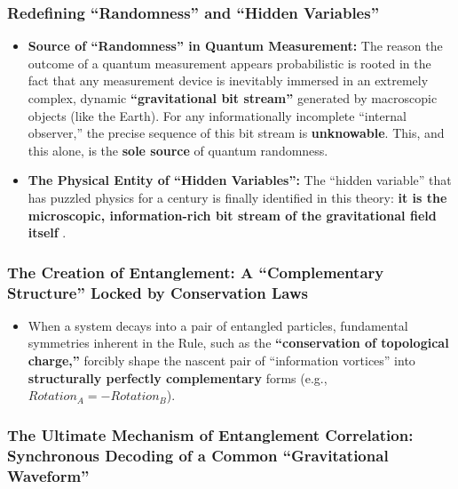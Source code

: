 \documentclass[11pt, a4paper]{article}
\begin{document}
\subsubsection{Redefining ``Randomness'' and ``Hidden Variables''}

\begin{itemize}
    \item \textbf{Source of ``Randomness'' in Quantum Measurement:}
    The reason the outcome of a quantum measurement appears probabilistic is rooted in the fact that any measurement device is inevitably immersed in an extremely complex, dynamic \textbf{``gravitational bit stream''} generated by macroscopic objects (like the Earth). For any informationally incomplete ``internal observer,'' the precise sequence of this bit stream is \textbf{unknowable}. This, and this alone, is the \textbf{sole source} of quantum randomness.

    \item \textbf{The Physical Entity of ``Hidden Variables'':}
    The ``hidden variable'' that has puzzled physics for a century is finally identified in this theory: \textbf{it is the microscopic, information-rich bit stream of the gravitational field itself} \cite{Bohm1952}.
\end{itemize}

\subsubsection{The Creation of Entanglement: A ``Complementary Structure'' Locked by Conservation Laws}

\begin{itemize}
    \item When a system decays into a pair of entangled particles, fundamental symmetries inherent in the Rule, such as the \textbf{``conservation of topological charge,''} forcibly shape the nascent pair of ``information vortices'' into \textbf{structurally perfectly complementary} forms (e.g., $Rotation_A = -Rotation_B$).
\end{itemize}

\subsubsection{The Ultimate Mechanism of Entanglement Correlation: Synchronous Decoding of a Common ``Gravitational Waveform''}
\end{document}

